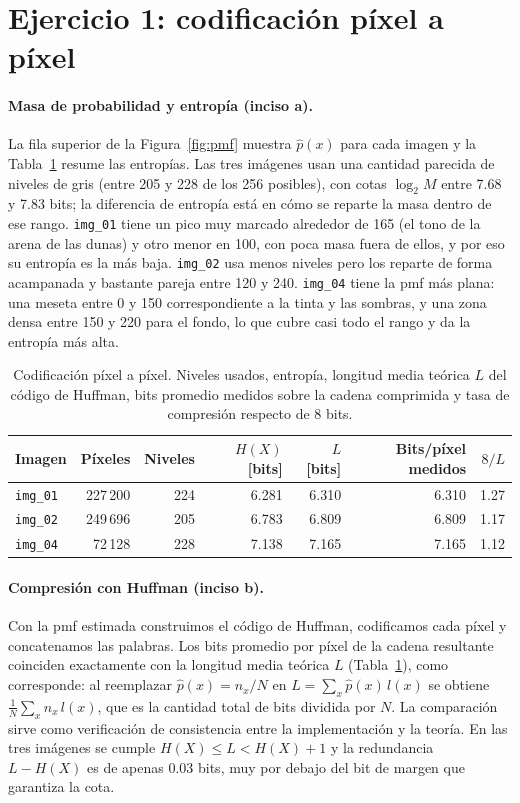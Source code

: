 \documentclass[11pt,a4paper]{article}
\newcommand{\img}[1]{\texttt{img\_#1}}
\begin{document}
\section{Ejercicio 1: codificación píxel a píxel}
\label{sec:ej1}
\paragraph{Masa de probabilidad y entropía (inciso a).}
La fila superior de la Figura~\ref{fig:pmf} muestra $\hat p(x)$ para cada imagen y la
Tabla~\ref{tab:ej1} resume las entropías. Las tres imágenes usan una cantidad parecida de niveles de
gris (entre 205 y 228 de los 256 posibles), con cotas $\log_2 M$ entre 7.68 y 7.83 bits;
 la diferencia de entropía está en cómo se reparte la masa dentro de ese
rango. \img{01} tiene un pico muy marcado alrededor de 165 (el tono de la arena de las dunas) y
otro menor en 100, con poca masa fuera de ellos, y por eso su entropía es la más baja. \img{02} usa
menos niveles pero los reparte de forma acampanada y bastante pareja entre 120 y 240. \img{04}
tiene la pmf más plana: una meseta entre 0 y 150 correspondiente a la tinta y las sombras, y una
zona densa entre 150 y 220 para el fondo, lo que cubre casi todo el rango y da la entropía más alta.

\begin{table}[H]
  \centering
  \caption{Codificación píxel a píxel. Niveles usados, entropía, longitud media teórica $L$ del código
  de Huffman, bits promedio medidos sobre la cadena comprimida y tasa de compresión respecto de 8 bits.}
  \label{tab:ej1}
  \begin{tabular}{lrrrrrr}
    \toprule
    Imagen & Píxeles & Niveles & $H(X)$ [bits] & $L$ [bits] & Bits/píxel medidos & $8/L$ \\
    \midrule
    \img{01} & 227\,200 & 224 & 6.281 & 6.310 & 6.310 & 1.27 \\
    \img{02} & 249\,696 & 205 & 6.783 & 6.809 & 6.809 & 1.17 \\
    \img{04} &  72\,128 & 228 & 7.138 & 7.165 & 7.165 & 1.12 \\
    \bottomrule
  \end{tabular}
\end{table}

\paragraph{Compresión con Huffman (inciso b).}
Con la pmf estimada construimos el código de Huffman, codificamos cada píxel y concatenamos las
palabras. Los bits promedio por píxel de la cadena resultante coinciden exactamente con la longitud
media teórica $L$ (Tabla~\ref{tab:ej1}), como corresponde: al reemplazar $\hat p(x) = n_x/N$ en
$L = \sum_x \hat p(x)\, l(x)$ se obtiene $\frac{1}{N}\sum_x n_x\, l(x)$, que es la cantidad total de
bits dividida por $N$. La comparación sirve como verificación de consistencia entre la implementación
y la teoría. En las tres imágenes se cumple $H(X) \le L < H(X) + 1$ y la redundancia $L - H(X)$ es de
apenas 0.03 bits, muy por debajo del bit de margen que garantiza la cota.
\end{document}
